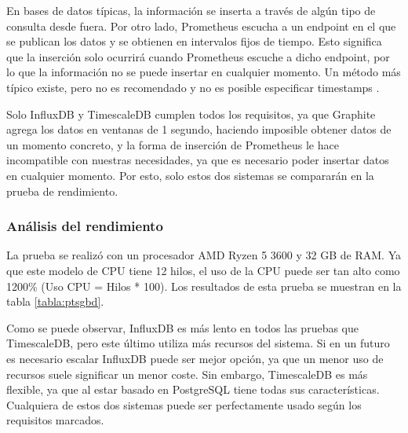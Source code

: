 En bases de datos típicas, la información se inserta a través de algún tipo de consulta desde fuera. Por otro lado, 
Prometheus escucha a un endpoint en el que se publican los datos y se obtienen en intervalos fijos de tiempo. Esto 
significa que la inserción solo ocurrirá cuando Prometheus escuche a dicho endpoint, por lo que la información no se 
puede insertar en cualquier momento. Un método más típico existe, pero no es recomendado y no es posible especificar 
timestamps \cite{prom:pushgateway}.

Solo InfluxDB y TimescaleDB cumplen todos los requisitos, ya que Graphite agrega los datos en ventanas de 1 segundo,
haciendo imposible obtener datos de un momento concreto, y la forma de inserción de Prometheus le hace incompatible 
con nuestras necesidades, ya que es necesario poder insertar datos en cualquier momento. Por esto, solo estos dos
sistemas se compararán en la prueba de rendimiento.

\subsubsection{Análisis del rendimiento} La prueba se realizó con un procesador AMD Ryzen 5 3600 y 32 GB de RAM. Ya que 
este modelo de CPU tiene 12 hilos, el uso de la CPU puede ser tan alto como 1200\% (Uso CPU = Hilos * 100). Los resultados
de esta prueba se muestran en la tabla \ref{tabla:ptsgbd}.


Como se puede observar, InfluxDB es más lento en todos las pruebas que TimescaleDB, pero este último utiliza más 
recursos del sistema. Si en un futuro es necesario escalar InfluxDB puede ser mejor opción, ya que un menor uso de 
recursos suele significar un menor coste. Sin embargo, TimescaleDB es más flexible, ya que al estar basado en PostgreSQL 
tiene todas sus características. Cualquiera de estos dos sistemas puede ser perfectamente usado según los requisitos marcados.

